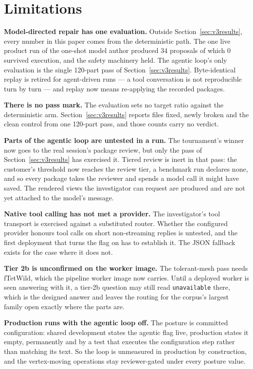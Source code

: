 \documentclass[10pt,onecolumn]{article}
\newcommand{\topic}[1]{\textbf{#1.}\hspace{0.5em}\ignorespaces}
\newcommand{\code}[1]{\texttt{\small #1}}
\begin{document}
\section{Limitations}

\topic{Model-directed repair has one evaluation} Outside Section~\ref{sec:v3results}, every
number in this paper comes from the deterministic path. The one live product run of the one-shot
model author produced 34 proposals of which 0 survived execution, and the safety machinery held.
The agentic loop's only evaluation is the single 120-part pass of Section~\ref{sec:v3results}. Byte-identical replay is retired for
agent-driven runs --- a tool conversation is not reproducible turn by turn --- and replay now means
re-applying the recorded packages.

\topic{There is no pass mark} The evaluation sets no target ratio against the deterministic arm.
Section~\ref{sec:v3results} reports files fixed, newly broken and the clean control from one
120-part pass, and those counts carry no verdict.

\topic{Parts of the agentic loop are untested in a run} The tournament's winner now goes to the
real session's package review, but only the pass of Section~\ref{sec:v3results} has exercised it.
Tiered review is inert in that pass: the customer's threshold now reaches the review tier, a
benchmark run declares none, and so every package takes the reviewer and spends a model call it
might have saved. The rendered views the investigator can request are produced and are not yet
attached to the model's message.

\topic{Native tool calling has not met a provider} The investigator's tool transport is exercised
against a substituted router. Whether the configured provider honours tool calls on short
non-streaming replies is untested, and the first deployment that turns the flag on has to establish
it. The JSON fallback exists for the case where it does not.

\topic{Tier 2b is unconfirmed on the worker image} The tolerant-mesh pass needs fTetWild, which
the pipeline worker image now carries. Until a deployed worker is seen answering with it, a tier-2b
question may still read \code{unavailable} there, which is the designed answer and leaves the
routing for the corpus's largest family open exactly where the parts are.

\topic{Production runs with the agentic loop off} The posture is committed configuration: shared
development states the agentic flag live, production states it empty, permanently and by a test
that executes the configuration step rather than matching its text. So the loop is unmeasured in
production by construction, and the vertex-moving operations stay reviewer-gated under every
posture value.
\end{document}
